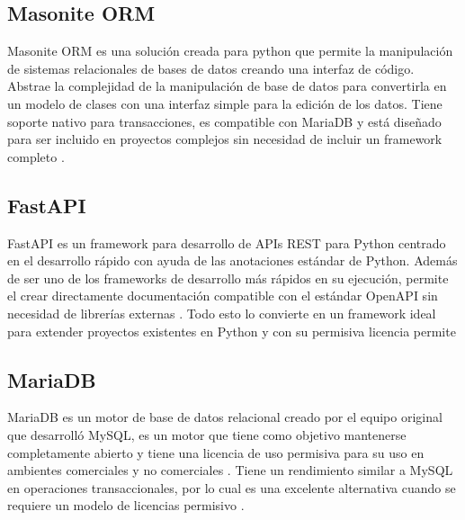 \subsection{Masonite ORM}

Masonite ORM es una solución creada para python que permite la manipulación de sistemas relacionales de bases de datos creando una interfaz de código. Abstrae la complejidad de la manipulación de base de datos para convertirla en un modelo de clases con una interfaz simple para la edición de los datos. Tiene soporte nativo para transacciones, es compatible con MariaDB y está diseñado para ser incluido en proyectos complejos sin necesidad de incluir un framework completo \cite{masonite_2021}.

\subsection{FastAPI}

FastAPI es un framework para desarrollo de APIs REST para Python centrado en el desarrollo rápido con ayuda de las anotaciones estándar de Python. Además de ser uno de los frameworks de desarrollo más rápidos en su ejecución, permite el crear directamente documentación compatible con el estándar OpenAPI sin necesidad de librerías externas \cite{fastapi_ramirez_2020}. Todo esto lo convierte en un framework ideal para extender proyectos existentes en Python y con su permisiva licencia permite %

\subsection{MariaDB}

MariaDB es un motor de base de datos relacional creado por el equipo original que desarrolló MySQL, es un motor que tiene como objetivo mantenerse completamente abierto y tiene una licencia de uso permisiva para su uso en ambientes comerciales y no comerciales \cite{mariadb_foundation_2019}. Tiene un rendimiento similar a MySQL en operaciones transaccionales, por lo cual es una excelente alternativa cuando se requiere un modelo de licencias permisivo \cite{mariadb_comparison}.




